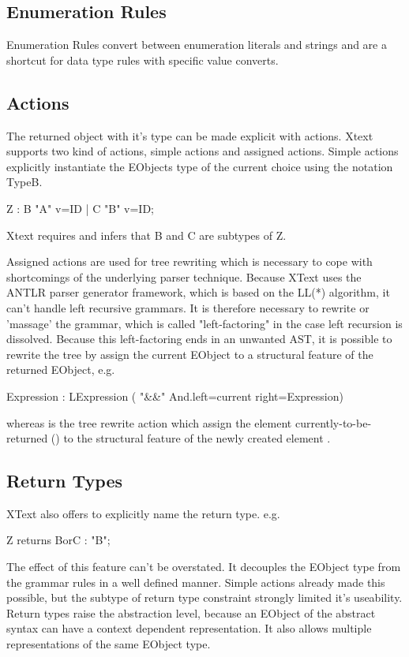 \subsection{Enumeration Rules}
Enumeration Rules convert between enumeration literals and strings and are a shortcut for data type rules with specific value converts.

\subsection{Actions}
The returned object with it's type can be made explicit with actions. Xtext supports two kind of actions, simple actions and assigned actions. Simple actions explicitly instantiate the EObjects type of the current choice using the notation {TypeB}.
\begin{xtxt}
Z 	: 	{B} "A" v=ID
	| 	{C} "B" v=ID;
\end{xtxt}
Xtext requires and infers that B and C are subtypes of Z. 

Assigned actions are used for tree rewriting which is necessary to cope with shortcomings of the underlying parser technique. Because XText uses the ANTLR parser generator framework, which is based on the LL(*) algorithm, it can't handle left recursive grammars. It is therefore necessary to rewrite or 'massage' the grammar, which is called "left-factoring" in the case left recursion is dissolved. Because this left-factoring ends in an unwanted AST, it is possible to rewrite the tree by assign the current EObject to a structural feature of the returned EObject, e.g. 
\begin{xtxt}
Expression 	: 	LExpression 
	 	( "&&" {And.left=current}  right=Expression)
\end{xtxt}
whereas  is the tree rewrite action which assign the element currently-to-be-returned () to the structural feature  of the newly created element .

\subsection{Return Types}
XText also offers to explicitly name the return type. e.g.
\begin{xtxt}
Z returns BorC	: "B";
\end{xtxt}
The effect of this feature can't be overstated.  It decouples the EObject type from the grammar rules in a well defined manner. Simple actions already made this possible, but the subtype of return type constraint strongly limited it's useability. Return types raise the abstraction level, because an EObject of the abstract syntax can have a context dependent representation. It also allows multiple representations of the same EObject type.

